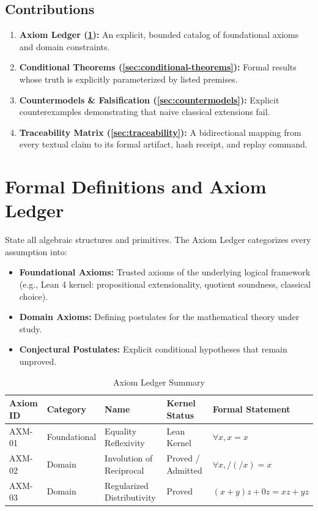 \documentclass[11pt,a4paper]{article}
\theoremstyle{plain}
\theoremstyle{definition}
\theoremstyle{remark}
\begin{document}
\subsection{Contributions}
\begin{enumerate}
    \item \textbf{Axiom Ledger (\cref{sec:axiom-ledger}):} An explicit, bounded catalog of foundational axioms and domain constraints.
    \item \textbf{Conditional Theorems (\cref{sec:conditional-theorems}):} Formal results whose truth is explicitly parameterized by listed premises.
    \item \textbf{Countermodels \& Falsification (\cref{sec:countermodels}):} Explicit counterexamples demonstrating that naive classical extensions fail.
    \item \textbf{Traceability Matrix (\cref{sec:traceability}):} A bidirectional mapping from every textual claim to its formal artifact, hash receipt, and replay command.
\end{enumerate}

\section{Formal Definitions and Axiom Ledger}
\label{sec:axiom-ledger}

State all algebraic structures and primitives. The Axiom Ledger categorizes every assumption into:
\begin{itemize}
    \item \textbf{Foundational Axioms:} Trusted axioms of the underlying logical framework (e.g., Lean 4 kernel: propositional extensionality, quotient soundness, classical choice).
    \item \textbf{Domain Axioms:} Defining postulates for the mathematical theory under study.
    \item \textbf{Conjectural Postulates:} Explicit conditional hypotheses that remain unproved.
\end{itemize}

\begin{table}[htbp]
\centering
\small
\caption{Axiom Ledger Summary}
\label{tab:axiom-ledger}
\begin{tabularx}{\textwidth}{llllX}
\toprule
\textbf{Axiom ID} & \textbf{Category} & \textbf{Name} & \textbf{Kernel Status} & \textbf{Formal Statement} \\
\midrule
AXM-01 & Foundational & Equality Reflexivity & Lean Kernel & $\forall x, x = x$ \\
AXM-02 & Domain & Involution of Reciprocal & Proved / Admitted & $\forall x, /(/x) = x$ \\
AXM-03 & Domain & Regularized Distributivity & Proved & $(x+y)z + 0z = xz + yz$ \\
\bottomrule
\end{tabularx}
\end{table}
\end{document}
